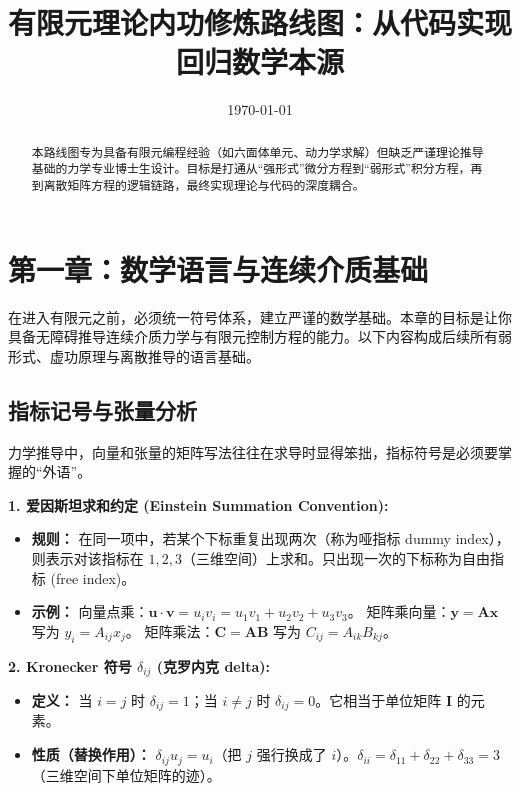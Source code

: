\documentclass[11pt, a4paper, UTF8]{ctexart}
\title{\textbf{有限元理论内功修炼路线图：从代码实现回归数学本源}}
\date{\today}
\begin{document}
\maketitle
\begin{abstract}
    本路线图专为具备有限元编程经验（如六面体单元、动力学求解）但缺乏严谨理论推导基础的力学专业博士生设计。目标是打通从“强形式”微分方程到“弱形式”积分方程，再到离散矩阵方程的逻辑链路，最终实现理论与代码的深度耦合。
\end{abstract}

\tableofcontents

\newpage

\section{第一章：数学语言与连续介质基础}
在进入有限元之前，必须统一符号体系，建立严谨的数学基础。本章的目标是让你具备无障碍推导连续介质力学与有限元控制方程的能力。以下内容构成后续所有弱形式、虚功原理与离散推导的语言基础。

\subsection{指标记号与张量分析}
力学推导中，向量和张量的矩阵写法往往在求导时显得笨拙，指标符号是必须要掌握的“外语”。

\textbf{1. 爱因斯坦求和约定 (Einstein Summation Convention):}
\begin{itemize}
    \item \textbf{规则：} 在同一项中，若某个下标重复出现两次（称为哑指标 dummy index），则表示对该指标在 $1,2,3$（三维空间）上求和。只出现一次的下标称为自由指标 (free index)。
    \item \textbf{示例：} 
    向量点乘：$\bm{u} \cdot \bm{v} = u_i v_i = u_1 v_1 + u_2 v_2 + u_3 v_3$。
    矩阵乘向量：$\bm{y} = \bm{A} \bm{x}$ 写为 $y_i = A_{ij} x_j$。
    矩阵乘法：$\bm{C} = \bm{A} \bm{B}$ 写为 $C_{ij} = A_{ik} B_{kj}$。
\end{itemize}

\textbf{2. Kronecker 符号 $\delta_{ij}$ (克罗内克 delta):}
\begin{itemize}
    \item \textbf{定义：} 当 $i=j$ 时 $\delta_{ij}=1$；当 $i \neq j$ 时 $\delta_{ij}=0$。它相当于单位矩阵 $\bm{I}$ 的元素。
    \item \textbf{性质（替换作用）：} $\delta_{ij} u_j = u_i$（把 $j$ 强行换成了 $i$）。$\delta_{ii} = \delta_{11} + \delta_{22} + \delta_{33} = 3$（三维空间下单位矩阵的迹）。
\end{itemize}
\end{document}
